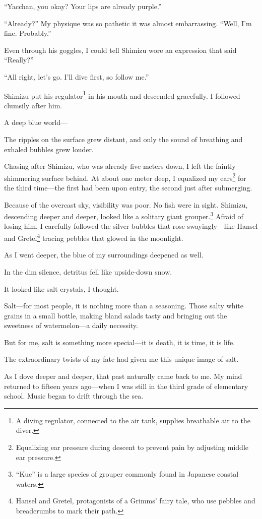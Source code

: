 \documentclass[
    a4paper,
    12pt,
    twoside,
    openany,
    UTF8,
    fontset=windows
]{ctexbook}
\begin{document}
``Yacchan, you okay? Your lips are already purple.''

``Already?'' My physique was so pathetic it was almost embarrassing. ``Well, I'm fine. Probably.''

Even through his goggles, I could tell Shimizu wore an expression that said ``Really?''

``All right, let's go. I'll dive first, so follow me.''

Shimizu put his regulator\footnote{A diving regulator, connected to the air tank, supplies breathable air to the diver.} in his mouth and descended gracefully. I followed clumsily after him.

A deep blue world---

The ripples on the surface grew distant, and only the sound of breathing and exhaled bubbles grew louder.

Chasing after Shimizu, who was already five meters down, I left the faintly shimmering surface behind. At about one meter deep, I equalized my ears\footnote{Equalizing ear pressure during descent to prevent pain by adjusting middle ear pressure.} for the third time---the first had been upon entry, the second just after submerging.

Because of the overcast sky, visibility was poor. No fish were in sight. Shimizu, descending deeper and deeper, looked like a solitary giant grouper.\footnote{``Kue'' is a large species of grouper commonly found in Japanese coastal waters.} Afraid of losing him, I carefully followed the silver bubbles that rose swayingly---like Hansel and Gretel\footnote{Hansel and Gretel, protagonists of a Grimms' fairy tale, who use pebbles and breadcrumbs to mark their path.} tracing pebbles that glowed in the moonlight.

As I went deeper, the blue of my surroundings deepened as well.

In the dim silence, detritus fell like upside-down snow.

It looked like salt crystals, I thought.

Salt---for most people, it is nothing more than a seasoning. Those salty white grains in a small bottle, making bland salads tasty and bringing out the sweetness of watermelon---a daily necessity.

But for me, salt is something more special---it is death, it is time, it is life.

The extraordinary twists of my fate had given me this unique image of salt.

As I dove deeper and deeper, that past naturally came back to me. My mind returned to fifteen years ago---when I was still in the third grade of elementary school. Music began to drift through the sea.
\end{document}
